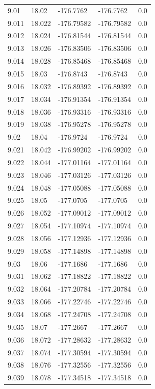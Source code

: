 \begin{tabular}{lllll}
9.01 & 18.02 & -176.7762 & -176.7762 & 0.0 \\
9.011 & 18.022 & -176.79582 & -176.79582 & 0.0 \\
9.012 & 18.024 & -176.81544 & -176.81544 & 0.0 \\
9.013 & 18.026 & -176.83506 & -176.83506 & 0.0 \\
9.014 & 18.028 & -176.85468 & -176.85468 & 0.0 \\
9.015 & 18.03 & -176.8743 & -176.8743 & 0.0 \\
9.016 & 18.032 & -176.89392 & -176.89392 & 0.0 \\
9.017 & 18.034 & -176.91354 & -176.91354 & 0.0 \\
9.018 & 18.036 & -176.93316 & -176.93316 & 0.0 \\
9.019 & 18.038 & -176.95278 & -176.95278 & 0.0 \\
9.02 & 18.04 & -176.9724 & -176.9724 & 0.0 \\
9.021 & 18.042 & -176.99202 & -176.99202 & 0.0 \\
9.022 & 18.044 & -177.01164 & -177.01164 & 0.0 \\
9.023 & 18.046 & -177.03126 & -177.03126 & 0.0 \\
9.024 & 18.048 & -177.05088 & -177.05088 & 0.0 \\
9.025 & 18.05 & -177.0705 & -177.0705 & 0.0 \\
9.026 & 18.052 & -177.09012 & -177.09012 & 0.0 \\
9.027 & 18.054 & -177.10974 & -177.10974 & 0.0 \\
9.028 & 18.056 & -177.12936 & -177.12936 & 0.0 \\
9.029 & 18.058 & -177.14898 & -177.14898 & 0.0 \\
9.03 & 18.06 & -177.1686 & -177.1686 & 0.0 \\
9.031 & 18.062 & -177.18822 & -177.18822 & 0.0 \\
9.032 & 18.064 & -177.20784 & -177.20784 & 0.0 \\
9.033 & 18.066 & -177.22746 & -177.22746 & 0.0 \\
9.034 & 18.068 & -177.24708 & -177.24708 & 0.0 \\
9.035 & 18.07 & -177.2667 & -177.2667 & 0.0 \\
9.036 & 18.072 & -177.28632 & -177.28632 & 0.0 \\
9.037 & 18.074 & -177.30594 & -177.30594 & 0.0 \\
9.038 & 18.076 & -177.32556 & -177.32556 & 0.0 \\
9.039 & 18.078 & -177.34518 & -177.34518 & 0.0 \\

\end{tabular}
